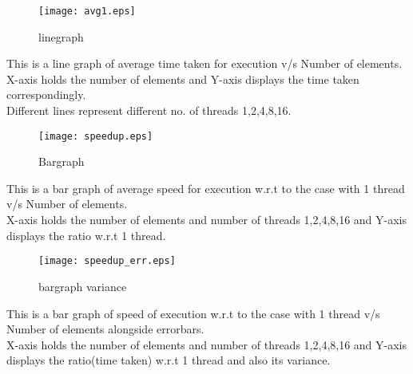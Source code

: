 \documentclass[20pt]{article}
\begin{document}
\begin{figure}
\texttt{[image: avg1.eps]}
\caption{linegraph}
\label{fig:avg graph}
\end{figure}
\noindent
This is a line graph of average time taken for execution v/s Number of
elements. \\
X-axis holds the number of elements  and
Y-axis displays the time taken correspondingly. \\
Different lines represent different no. of threads {1,2,4,8,16}.

\clearpage

\begin{figure}
\texttt{[image: speedup.eps]}
\caption{Bargraph}
\label{fig:Bar graph}
\end{figure}
\noindent
This is a bar graph of average speed for execution w.r.t to the case
with 1 thread v/s Number of elements. \\
X-axis holds the number of elements  and
number of threads {1,2,4,8,16} and Y-axis displays the ratio w.r.t 1
thread.

\clearpage


\begin{figure}
\texttt{[image: speedup\_err.eps]}
\caption{bargraph variance}
\label{fig:Bar graph with error}
\end{figure}
\noindent
This is a bar graph of  speed of execution w.r.t to the case
with 1 thread v/s Number of elements alongside errorbars. \\
X-axis holds the number of elements  and
number of threads {1,2,4,8,16} and Y-axis displays the ratio(time taken)
w.r.t 1 thread and also its variance.
\end{document}
